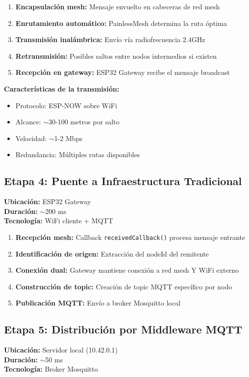 \documentclass[12pt]{article}
\begin{document}
\begin{enumerate}
    \item \textbf{Encapsulación mesh:} Mensaje envuelto en cabeceras de red mesh
    \item \textbf{Enrutamiento automático:} PainlessMesh determina la ruta óptima
    \item \textbf{Transmisión inalámbrica:} Envío vía radiofrecuencia 2.4GHz
    \item \textbf{Retransmisión:} Posibles saltos entre nodos intermedios si existen
    \item \textbf{Recepción en gateway:} ESP32 Gateway recibe el mensaje broadcast
\end{enumerate}

\textbf{Características de la transmisión:}
\begin{itemize}
    \item Protocolo: ESP-NOW sobre WiFi
    \item Alcance: $\sim$30-100 metros por salto
    \item Velocidad: $\sim$1-2 Mbps
    \item Redundancia: Múltiples rutas disponibles
\end{itemize}

\subsection{Etapa 4: Puente a Infraestructura Tradicional}
\textbf{Ubicación:} ESP32 Gateway\\
\textbf{Duración:} $\sim$200 ms\\
\textbf{Tecnología:} WiFi cliente + MQTT

\begin{enumerate}
    \item \textbf{Recepción mesh:} Callback \texttt{receivedCallback()} procesa mensaje entrante
    \item \textbf{Identificación de origen:} Extracción del nodeId del remitente
    \item \textbf{Conexión dual:} Gateway mantiene conexión a red mesh Y WiFi externo
    \item \textbf{Construcción de topic:} Creación de topic MQTT específico por nodo
    \item \textbf{Publicación MQTT:} Envío a broker Mosquitto local
\end{enumerate}

\subsection{Etapa 5: Distribución por Middleware MQTT}
\textbf{Ubicación:} Servidor local (10.42.0.1)\\
\textbf{Duración:} $\sim$50 ms\\
\textbf{Tecnología:} Broker Mosquitto
\end{document}
